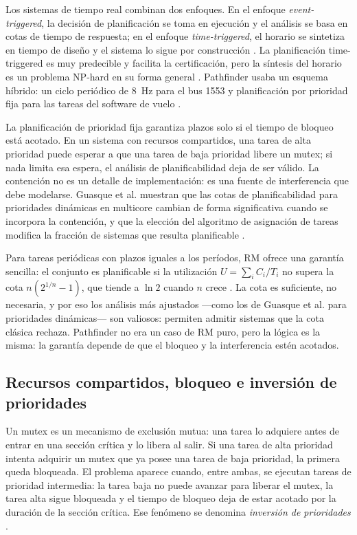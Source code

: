 \documentclass[journal]{IEEEtran}
\begin{document}
Los sistemas de tiempo real combinan dos enfoques. En el enfoque \emph{event-triggered}, la decisión de planificación se toma en ejecución y el análisis se basa en cotas de tiempo de respuesta; en el enfoque \emph{time-triggered}, el horario se sintetiza en tiempo de diseño y el sistema lo sigue por construcción \cite{minaeva2021survey}. La planificación time-triggered es muy predecible y facilita la certificación, pero la síntesis del horario es un problema NP-hard en su forma general \cite{minaeva2021survey}. Pathfinder usaba un esquema híbrido: un ciclo periódico de 8~Hz para el bus 1553 y planificación por prioridad fija para las tareas del software de vuelo \cite{reeves1997mars}.

La planificación de prioridad fija garantiza plazos solo si el tiempo de bloqueo está acotado. En un sistema con recursos compartidos, una tarea de alta prioridad puede esperar a que una tarea de baja prioridad libere un mutex; si nada limita esa espera, el análisis de planificabilidad deja de ser válido. La contención no es un detalle de implementación: es una fuente de interferencia que debe modelarse. Guasque et al. muestran que las cotas de planificabilidad para prioridades dinámicas en multicore cambian de forma significativa cuando se incorpora la contención, y que la elección del algoritmo de asignación de tareas modifica la fracción de sistemas que resulta planificable \cite{guasque2022schedulability}.

Para tareas periódicas con plazos iguales a los períodos, RM ofrece una garantía sencilla: el conjunto es planificable si la utilización $U=\sum_i C_i/T_i$ no supera la cota $n(2^{1/n}-1)$, que tiende a $\ln 2$ cuando $n$ crece \cite{liu1973scheduling}. La cota es suficiente, no necesaria, y por eso los análisis más ajustados ---como los de Guasque et al. para prioridades dinámicas--- son valiosos: permiten admitir sistemas que la cota clásica rechaza. Pathfinder no era un caso de RM puro, pero la lógica es la misma: la garantía depende de que el bloqueo y la interferencia estén acotados.

\subsection{Recursos compartidos, bloqueo e inversión de prioridades}

Un mutex es un mecanismo de exclusión mutua: una tarea lo adquiere antes de entrar en una sección crítica y lo libera al salir. Si una tarea de alta prioridad intenta adquirir un mutex que ya posee una tarea de baja prioridad, la primera queda bloqueada. El problema aparece cuando, entre ambas, se ejecutan tareas de prioridad intermedia: la tarea baja no puede avanzar para liberar el mutex, la tarea alta sigue bloqueada y el tiempo de bloqueo deja de estar acotado por la duración de la sección crítica. Ese fenómeno se denomina \emph{inversión de prioridades} \cite{sha1990priority}.
\end{document}
